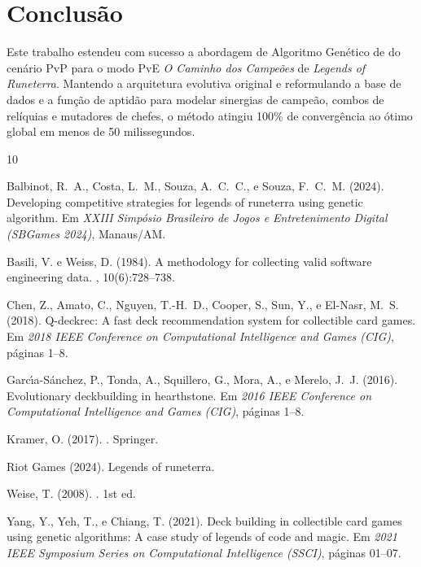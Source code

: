 \documentclass[12pt]{article}
\begin{document}
\section{Conclusão}

Este trabalho estendeu com sucesso a abordagem de Algoritmo Genético de \cite{balbinot2024} do cenário PvP para o modo PvE \textit{O Caminho dos Campeões} de \textit{Legends of Runeterra}. Mantendo a arquitetura evolutiva original e reformulando a base de dados e a função de aptidão para modelar sinergias de campeão, combos de relíquias e mutadores de chefes, o método atingiu 100\% de convergência ao ótimo global em menos de 50 milissegundos.

\begin{thebibliography}{10}

Balbinot, R.~A., Costa, L.~M., Souza, A.~C.~C., e Souza, F.~C.~M. (2024).
\newblock Developing competitive strategies for legends of runeterra using genetic algorithm.
\newblock Em {\em XXIII Simpósio Brasileiro de Jogos e Entretenimento Digital (SBGames 2024)}, Manaus/AM.

Basili, V. e Weiss, D. (1984).
\newblock A methodology for collecting valid software engineering data.
, 10(6):728--738.

Chen, Z., Amato, C., Nguyen, T.-H.~D., Cooper, S., Sun, Y., e El-Nasr, M.~S. (2018).
\newblock Q-deckrec: A fast deck recommendation system for collectible card games.
\newblock Em {\em 2018 IEEE Conference on Computational Intelligence and Games (CIG)}, páginas 1--8.

Garc{\'\i}a-S{\'a}nchez, P., Tonda, A., Squillero, G., Mora, A., e Merelo, J.~J. (2016).
\newblock Evolutionary deckbuilding in hearthstone.
\newblock Em {\em 2016 IEEE Conference on Computational Intelligence and Games (CIG)}, páginas 1--8.

Kramer, O. (2017).
.
\newblock Springer.

Riot Games (2024).
\newblock Legends of runeterra.

Weise, T. (2008).
.
\newblock 1st ed.

Yang, Y., Yeh, T., e Chiang, T. (2021).
\newblock Deck building in collectible card games using genetic algorithms: A case study of legends of code and magic.
\newblock Em {\em 2021 IEEE Symposium Series on Computational Intelligence (SSCI)}, páginas 01--07.

\end{thebibliography}
\end{document}
